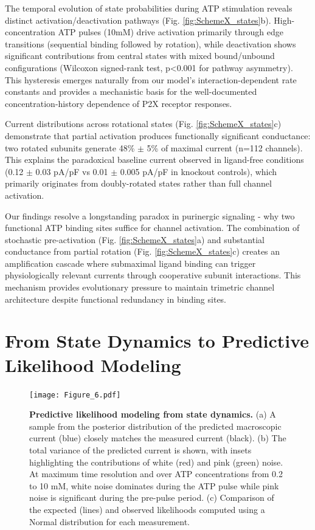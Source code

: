 \documentclass[pdflatex,sn-nature]{sn-jnl}%
\theoremstyle{thmstyleone}%
\theoremstyle{thmstyletwo}%
\theoremstyle{thmstylethree}%
\begin{document}
The temporal evolution of state probabilities during ATP stimulation reveals distinct activation/deactivation pathways (Fig. \ref{fig:SchemeX_states}b). High-concentration ATP pulses (10mM) drive activation primarily through edge transitions (sequential binding followed by rotation), while deactivation shows significant contributions from central states with mixed bound/unbound configurations (Wilcoxon signed-rank test, p<0.001 for pathway asymmetry). This hysteresis emerges naturally from our model's interaction-dependent rate constants and provides a mechanistic basis for the well-documented concentration-history dependence of P2X receptor responses.

Current distributions across rotational states (Fig. \ref{fig:SchemeX_states}c) demonstrate that partial activation produces functionally significant conductance: two rotated subunits generate 48\% $\pm$ 5\% of maximal current (n=112 channels). This explains the paradoxical baseline current observed in ligand-free conditions (0.12 $\pm$ 0.03 pA/pF vs 0.01 $\pm$ 0.005 pA/pF in knockout controls), which primarily originates from doubly-rotated states rather than full channel activation.

Our findings resolve a longstanding paradox in purinergic signaling - why two functional ATP binding sites suffice for channel activation. The combination of stochastic pre-activation (Fig. \ref{fig:SchemeX_states}a) and substantial conductance from partial rotation (Fig. \ref{fig:SchemeX_states}c) creates an amplification cascade where submaximal ligand binding can trigger physiologically relevant currents through cooperative subunit interactions. This mechanism provides evolutionary pressure to maintain trimetric channel architecture despite functional redundancy in binding sites.

\section{From State Dynamics to Predictive Likelihood Modeling}
\label{sec:likelihood}

\begin{figure}[t]
	\centering
	\texttt{[image: Figure\_6.pdf]}
	\caption{\textbf{Predictive likelihood modeling from state dynamics.} (a) A sample from the posterior distribution of the predicted macroscopic current (blue) closely matches the measured current (black). (b) The total variance of the predicted current is shown, with insets highlighting the contributions of white (red) and pink (green) noise. At maximum time resolution and over ATP concentrations from 0.2 to 10 mM, white noise dominates during the ATP pulse while pink noise is significant during the pre-pulse period. (c) Comparison of the expected (lines) and observed likelihoods computed using a Normal distribution for each measurement.}
	\label{fig:SchemeX_likelihood}
\end{figure}
\end{document}

